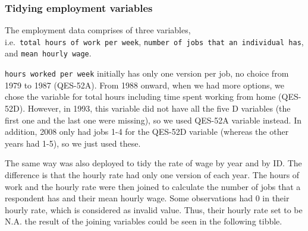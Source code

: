 \hypertarget{tidying-employment-variables}{%
\subsubsection{Tidying employment
variables}\label{tidying-employment-variables}}

The employment data comprises of three variables,
i.e.~\texttt{total\ hours\ of\ work\ per\ week},
\texttt{number\ of\ jobs\ that\ an\ individual\ has}, and
\texttt{mean\ hourly\ wage}.

\texttt{hours\ worked\ per\ week} initially has only one version per
job, no choice from 1979 to 1987 (QES-52A). From 1988 onward, when we
had more options, we chose the variable for total hours including time
spent working from home (QES-52D). However, in 1993, this variable did
not have all the five D variables (the first one and the last one were
missing), so we used QES-52A variable instead. In addition, 2008 only
had jobs 1-4 for the QES-52D variable (whereas the other years had 1-5),
so we just used these.

\begin{Schunk}
\end{Schunk}

The same way was also deployed to tidy the rate of wage by year and by
ID. The difference is that the hourly rate had only one version of each
year. The hours of work and the hourly rate were then joined to
calculate the number of jobs that a respondent has and their mean hourly
wage. Some observations had 0 in their hourly rate, which is considered
as invalid value. Thus, their hourly rate set to be N.A. the result of
the joining variables could be seen in the following tibble.

